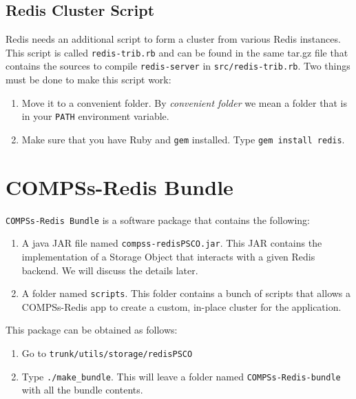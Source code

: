 \documentclass{article}
\begin{document}
\subsection{Redis Cluster Script}
Redis needs an additional script to form a cluster from various Redis instances. This script is called \verb|redis-trib.rb| and can be found in the same tar.gz file that contains the sources to compile \verb|redis-server| in \verb|src/redis-trib.rb|. Two things must be done to make this script work:
\begin{enumerate}
\item Move it to a convenient folder. By \textit{convenient folder} we mean a folder that is in your \verb|PATH| environment variable.
\item Make sure that you have Ruby and \verb|gem| installed. Type \verb|gem install redis|.
\end{enumerate}

\section{COMPSs-Redis Bundle}
\verb|COMPSs-Redis Bundle| is a software package that contains the following:
\begin{enumerate}
\item A java JAR file named \verb|compss-redisPSCO.jar|. This JAR contains the implementation of a Storage Object that interacts with a given Redis backend. We will discuss the details later.
\item A folder named \verb|scripts|. This folder contains a bunch of scripts that allows a COMPSs-Redis app to create a custom, in-place cluster  for the application.
\end{enumerate}
This package can be obtained as follows:
\begin{enumerate}
\item Go to \verb|trunk/utils/storage/redisPSCO|
\item Type \verb|./make_bundle|. This will leave a folder named \verb|COMPSs-Redis-bundle| with all the bundle contents.
\end{enumerate}
\end{document}
